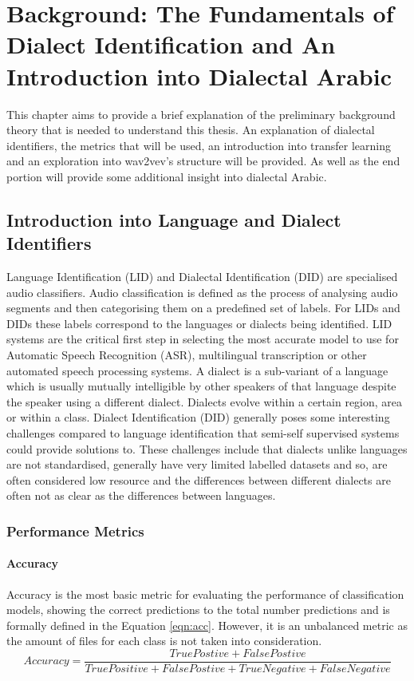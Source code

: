\chapter{Background: The Fundamentals of Dialect Identification and An Introduction into Dialectal Arabic}\label{ch:background}
This chapter aims to provide a brief explanation of the preliminary background theory that is needed to understand this thesis. 
An explanation of dialectal identifiers, the metrics that will be used, an introduction into transfer learning and an exploration 
into wav2vev's structure will be provided. As well as the end portion will provide some additional insight into dialectal Arabic. 
\section{Introduction into Language and Dialect Identifiers}\label{sect:introDID}
Language Identification (LID) and Dialectal Identification (DID) are specialised audio classifiers. 
Audio classification is defined as the process of analysing audio segments and then categorising them on a 
predefined set of labels. For LIDs and DIDs these labels correspond to the languages or dialects being identified. 
LID systems are the critical first step in selecting the most accurate model to 
use for Automatic Speech Recognition (ASR), multilingual transcription or other automated speech processing systems. 
A dialect is a sub-variant of a language which is usually mutually intelligible by other speakers of that 
language despite the speaker using a different dialect. Dialects evolve within a certain region, area 
or within a class. Dialect Identification (DID) generally poses some interesting challenges compared to language 
identification that semi-self supervised systems could provide solutions to. These challenges include that 
dialects unlike languages are not standardised, generally have very limited labelled datasets and 
so, are often considered low resource and the differences between different dialects are often not as clear 
as the differences between languages. 

\subsection{Performance Metrics}
\subsubsection{Accuracy}
Accuracy is the most basic metric for evaluating the performance of classification models, 
showing the correct predictions to the total number predictions and is formally defined in the Equation \ref{eqn:acc}. However, it is an unbalanced metric 
as the amount of files for each class is not taken into consideration. 
\begin{equation}
    \label{eqn:acc}
    Accuracy =\frac{TruePostive + FalsePostive}{TruePositive + FalsePostive + TrueNegative + FalseNegative}
\end{equation}

